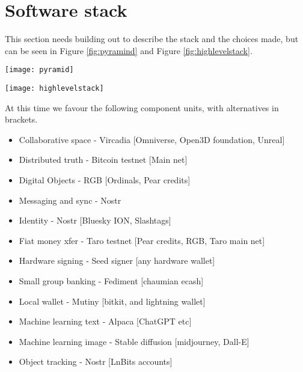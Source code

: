 \section{Software stack}
This section needs building out to describe the stack and the choices made, but can be seen in Figure \ref{fig:pyramind} and Figure \ref{fig:highlevelstack}.

\begin{figure*}[ht]\centering 	\texttt{[image: pyramid]}
	\caption{Pyramid showing the components for sats, stablecoins on lightning, asssets, and trust}
	\label{fig:pyramind}
\end{figure*}

\begin{figure*}[ht]\centering 	\texttt{[image: highlevelstack]}
	\caption{High level overview showing the components for sats, stablecoins on lightning, asssets, and trust}
	\label{fig:highlevelstack}
\end{figure*}

At this time we favour the following component units, with alternatives in brackets.
\begin{itemize}
\item Collaborative space - Vircadia [Omniverse, Open3D foundation, Unreal]
\item Distributed truth - Bitcoin testnet [Main net]
\item Digital Objects - RGB [Ordinals, Pear credits]
\item Messaging and sync - Nostr 
\item Identity - Nostr [Bluesky ION, Slashtags]
\item Fiat money xfer - Taro testnet [Pear credits, RGB, Taro main net]
\item Hardware signing - Seed signer [any hardware wallet]
\item Small group banking - Fediment [chaumian ecash]
\item Local wallet - Mutiny [bitkit, and lightning wallet]
\item Machine learning text - Alpaca [ChatGPT etc]
\item Machine learning image - Stable diffusion [midjourney, Dall-E]
\item Object tracking - Nostr [LnBits accounts]
\end{itemize}


